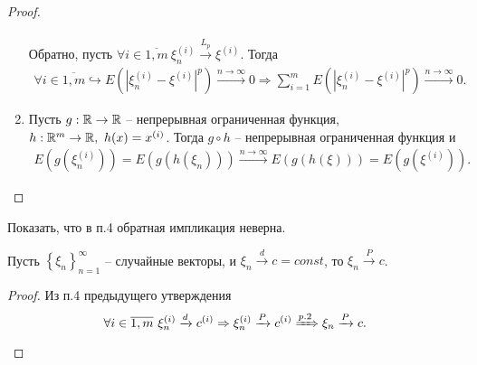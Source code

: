 \begin{proof}
\begin{enumerate}
\begin{gather*}
		\end{gather*}
		Обратно, пусть $\forall i\in \overline{1,m} \ \xi _{n}^{( i)}\xrightarrow{L_{p}} \xi ^{( i)}$. Тогда
		\begin{gather*}
		    \forall i \in \overline{1,m}\hookrightarrow E\left(\left|\xi_n^{(i)} - \xi^{(i)}\right|^p\right) \xrightarrow{n \rightarrow \infty} 0 \Rightarrow \sum_{i=1}^{m}E\left(\left|\xi_n^{(i)}- \xi^{(i)}\right|^p\right) \xrightarrow{n\rightarrow\infty} 0.
		\end{gather*}
		\item Пусть $g:\mathbb{R}\rightarrow\mathbb{R}$ -- непрерывная ограниченная функция, $h:\mathbb{R}^m \rightarrow \mathbb{R},\ h(x) = x^{(i)}$. Тогда $g \circ h$ -- непрерывная ограниченная функция и
		\begin{gather*}
		    E\left(g\left(\xi_n^{(i)}\right)\right) = E\left(g\left(h\left(\xi_n\right)\right)\right) \xrightarrow{n \rightarrow \infty} E\left(g\left(h\left(\xi\right)\right)\right) = E\left(g\left(\xi^{(i)}\right)\right).
		\end{gather*}
	\end{enumerate}

\end{proof}

\begin{exercise}
	Показать, что в п.4 обратная импликация неверна.
\end{exercise}

\begin{proposition}
	Пусть $\left\{\xi_n\right\}_{n=1}^\infty$ -- случайные векторы, и $\xi_n \xrightarrow{d} c = const$, то $\xi_n \xrightarrow{P} c$.
\end{proposition}

\begin{proof}
	Из п.4 предыдущего утверждения
	\begin{gather*}
	    \forall i \in \overline{1,m}\ \xi_n^{(i)} \xrightarrow{d} c^{(i)} \Rightarrow \xi_n^{(i)} \xrightarrow{P} c^{(i)} \xRightarrow[]{p.2} \xi_n \xrightarrow{P} c.
	\end{gather*}
\end{proof}

